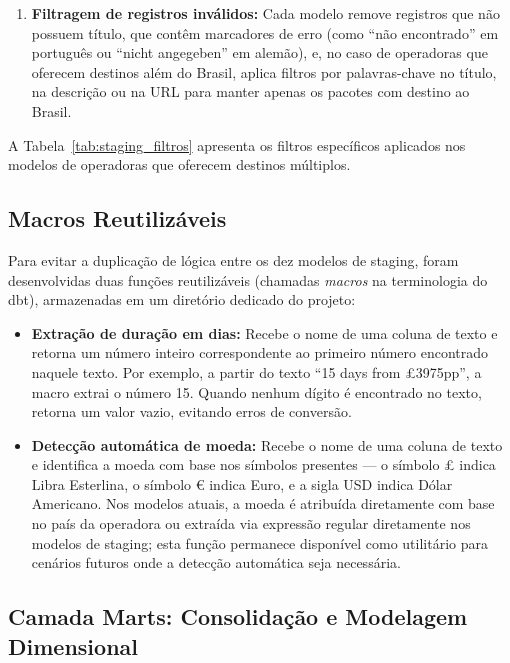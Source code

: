 \begin{enumerate}
    \item \textbf{Filtragem de registros inválidos:} Cada modelo remove registros que
    não possuem título, que contêm marcadores de erro (como ``não encontrado'' em
    português ou ``nicht angegeben'' em alemão), e, no caso de operadoras que oferecem
    destinos além do Brasil, aplica filtros por palavras-chave no título, na descrição
    ou na URL para manter apenas os pacotes com destino ao Brasil.
\end{enumerate}

A Tabela~\ref{tab:staging_filtros} apresenta os filtros específicos aplicados nos
modelos de operadoras que oferecem destinos múltiplos.



\subsection{Macros Reutilizáveis}

Para evitar a duplicação de lógica entre os dez modelos de staging, foram desenvolvidas
duas funções reutilizáveis (chamadas \textit{macros} na terminologia do dbt),
armazenadas em um diretório dedicado do projeto:

\begin{itemize}
    \item \textbf{Extração de duração em dias:} Recebe o nome de uma coluna de texto e
    retorna um número inteiro correspondente ao primeiro número encontrado naquele texto.
    Por exemplo, a partir do texto ``15 days from £3975pp'', a macro extrai o número 15.
    Quando nenhum dígito é encontrado no texto, retorna um valor vazio, evitando erros
    de conversão.

    \item \textbf{Detecção automática de moeda:} Recebe o nome de uma coluna de texto e
    identifica a moeda com base nos símbolos presentes — o símbolo £ indica Libra
    Esterlina, o símbolo € indica Euro, e a sigla USD indica Dólar Americano. Nos
    modelos atuais, a moeda é atribuída diretamente com base no país da operadora ou
    extraída via expressão regular diretamente nos modelos de staging; esta função
    permanece disponível como utilitário para cenários futuros onde a detecção
    automática seja necessária.
\end{itemize}

\subsection{Camada Marts: Consolidação e Modelagem Dimensional}

